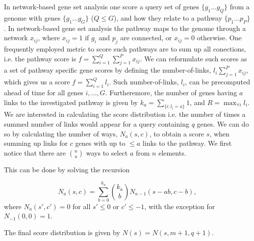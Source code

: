 \documentclass[11pt]{article}
\begin{document}
In network-based gene set analysis one score a query set of genes $ \{g_1 \ldots g_Q\} $ from a genome with genes $\{g_1 \ldots g_G\}$ ($Q \le G$), and how they relate to a pathway $\{p_1 \ldots p_P\}$. In network-based gene set analysis the pathway maps to the genome through a network ${x_{ij}}$, where $x_{ij}=1$ if $g_i$ and $p_j$ are connected, or $x_{ij}=0$ otherwise. One frequently employed metric to score such pathways are to sum up all conections, i.e. the pathway score is $f=\sum_{i=1}^Q\sum_{j=1}^P x_{ij}$.
We can reformulate such scores as a set of pathway specific gene scores by defining the number-of-links, $l_i\sum_{j=1}^P x_{ij}$, which gives us a score $f=\sum_{i=1}^Q l_i$.
Such number-of-links, $l_i$, can be precomputed ahead of time for all genes $i, \ldots, G$.
Furtheremore, the number of genes having $a$ links to the investigated pathway is given by $k_a=\sum_{\{i:l_i=a\}}1$, and $R=\max_{\forall i}{l_i}$.
We are interested in calculating the score distribution i.e. the number of times a summed number of links would appear for a query containing $q$ genes.
We can do so by calculating the number of ways, $N_a(s,c)$, to obtain a score $s$, when summing up links for $c$ genes with up to $\le a$ links to the pathway.
We first notice that there are $n\choose a$ ways to select $a$ from $n$ elements.

This can be done by solving the recursion

\[
N_a(s,c)=\sum_{b=0}^{k_a}{k_a \choose b} N_{a-1}(s-ab,c-b),
\]
where $N_a(s',c')=0$ for all $s'\le 0$ or $c' \le -1$, with the exception for $N_{-1}(0,0)=1$.

The final score distribution is given by $N(s)=N(s,m+1,q+1)$.
\end{document}
